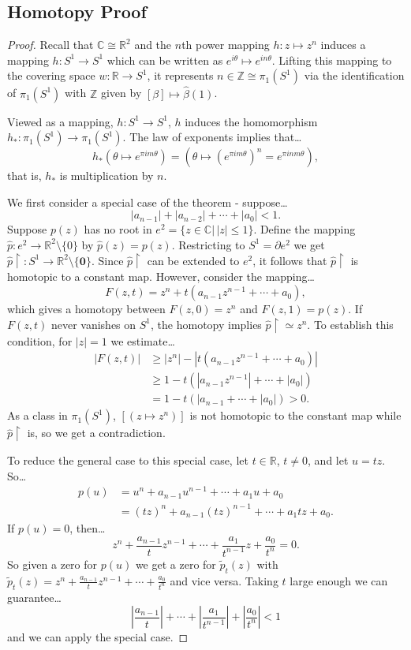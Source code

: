 \subsection{Homotopy Proof}\label{homotopyproofofFOA}

\begin{proof}
Recall that $\mathbb{C} \cong \mathbb{R}^2$ and the $n$th power mapping $h : z \mapsto z^n$ induces a mapping $h : S^1 \rightarrow S^1$
which can be written as $e^{i \theta} \mapsto e^{in\theta}$. Lifting this mapping to the covering space $w : \mathbb{R} \rightarrow S^1$, it represents
$n \in \mathbb{Z} \cong \pi_1(S^1)$ via the identification of $\pi_1(S^1)$ with $\mathbb{Z}$ given by $[\beta] \mapsto \hat{\beta}(1)$.

Viewed as a mapping, $h : S^1 \rightarrow S^1$, $h$ induces the homomorphism $h_* : \pi_1(S^1) \rightarrow \pi_1(S^1)$. The law of exponents implies that\dots
$$h_*(\theta \mapsto e^{\pi i m \theta}) = (\theta \mapsto (e^{\pi i m \theta})^n = e^{\pi i n m \theta}),$$
that is, $h_*$ is multiplication by $n$.

We first consider a special case of the theorem - suppose\dots
$$|a_{n-1}| + |a_{n-2}| + \cdots + |a_0| < 1.$$
Suppose $p(z)$ has no root in $e^2 = \{ z \in \mathbb{C} | \, |z| \leq 1 \}$. Define the mapping $\hat{p} : e^2 \rightarrow \mathbb{R}^2 \setminus \{ 0 \}$ by $\hat{p}(z) = p(z)$.
Restricting to $S^1 = \partial e^2$ we get $\hat{p} \upharpoonright : S^1 \rightarrow \mathbb{R}^2 \setminus \{ \textbf{0} \}$. Since $\hat{p} \upharpoonright$ can be extended to $e^2$,
it follows that $\hat{p} \upharpoonright$ is homotopic to a constant map. However, consider the mapping\dots
$$F(z,t) = z^n + t(a_{n-1}z^{n-1} + \cdots + a_0),$$
which gives a homotopy between $F(z,0) = z^n$ and $F(z,1) = p(z)$. If $F(z,t)$ never vanishes on $S^1$, the homotopy implies $\hat{p} \upharpoonright \simeq z^n$. To establish this condition,
for $|z| = 1$ we estimate\dots
\begin{align*}
|F(z,t)| &\geq |z^n| - |t(a_{n-1}z^{n-1} + \cdots + a_0)|\\
		 &\geq 1 - t(|a_{n-1}z^{n-1}| + \cdots + |a_0|)\\
		 &= 1 - t(|a_{n-1} + \cdots + |a_0|) > 0.
\end{align*}
As a class in $\pi_1(S^1)$, $[(z \mapsto z^n)]$ is not homotopic to the constant map while $\hat{p}\upharpoonright$ is, so we get a contradiction.

To reduce the general case to this special case, let $t \in \mathbb{R}$, $t \neq 0$, and let $u = tz$. So\dots
\begin{align*}
p(u) &= u^n + a_{n-1}u^{n-1} + \cdots + a_1u + a_0\\
	 &= (tz)^n + a_{n-1}(tz)^{n-1} + \cdots + a_1tz + a_0.
\end{align*}
If $p(u) = 0$, then\dots
$$z^n + \frac{a_{n-1}}{t}z^{n-1} + \cdots + \frac{a_{1}}{t^{n-1}}z + \frac{a_0}{t^n} =0.$$
So given a zero for $p(u)$ we get a zero for $\tilde p_t(z)$ with $\tilde p_t(z) = z^n + \frac{a_{n-1}}{t}z^{n-1} + \cdots + \frac{a_0}{t^n}$ and vice versa.
Taking $t$ large enough we can guarantee\dots
$$|\frac{a_{n-1}}{t}| + \cdots + |\frac{a_1}{t^{n-1}}| + |\frac{a_0}{t^n}| < 1$$
and we can apply the special case.
\end{proof}